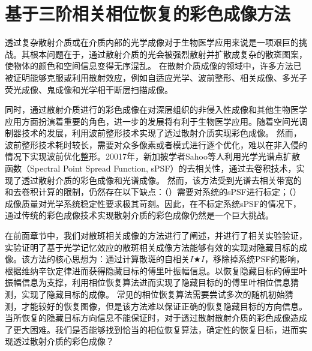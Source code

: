 
\chapter{基于三阶相关相位恢复的彩色成像方法}

透过复杂散射介质或在介质内部的光学成像对于生物医学应用来说是一项艰巨的挑战。其根本问题在于，通过散射介质的光会被强烈散射并扩散成复杂的散斑图案，使物体的颜色和空间信息变得无序混乱\cite{Freund1988,goodman_speckle_2007,bertolotti_non-invasive_2012,katz_non-invasive_2014,Yllmaz2019}。
在散射介质成像的领域中，许多方法已被证明能够克服或利用散射效应\cite{newman_imaging_2016,godara_adaptive_2010,katz_looking_2012,larson_water-soluble_2003,liu_imaging_2011,paniagua-diaz_blind_2019}，例如自适应光学\cite{godara_adaptive_2010}、波前整形\cite{katz_looking_2012}、相关成像\cite{bertolotti_non-invasive_2012,katz_non-invasive_2014}、多光子荧光成像\cite{liu_imaging_2011,larson_water-soluble_2003}、鬼成像\cite{paniagua-diaz_blind_2019}和光学相干断层扫描成像\cite{park_full-field_2014}。

同时，通过散射介质进行的彩色成像\cite{conkey_color_2012,leung_acousto-optic_2013,sahoo_single-shot_2017}在对深层组织的非侵入性成像和其他生物医学应用方面扮演着重要的角色，进一步的发展将有利于生物医学应用。随着空间光调制器技术的发展，利用波前整形技术实现了透过散射介质实现彩色成像\cite{leung_acousto-optic_2013,sahoo_single-shot_2017}。
然而，波前整形技术耗时较长，需要对众多像素或者模式进行逐个优化，难以在非入侵的情况下实现波前优化整形。20017年，新加披学者Sahoo等人\cite{sahoo_single-shot_2017}利用光学光谱点扩散函数（Spectral Point Spread Function, sPSF）\cite{Freund1988,goodman_speckle_2007}的去相关性，通过去卷积技术，实现了透过散射介质的彩色成像和光谱成像。
然而，该方法受到光谱去相关带宽的和去卷积计算的限制，仍然存在以下缺点：（）需要对系统的sPSF进行标定；（）成像质量对光学系统稳定性要求极其苛刻。因此，在不标定系统sPSF的情况下，通过传统的彩色成像技术实现散射介质的彩色成像仍然是一个巨大挑战。

在前面章节中，我们对散斑相关成像的方法进行了阐述，并进行了相关实验验证，实验证明了基于光学记忆效应的散斑相关成像方法能够有效的实现对隐藏目标的成像。该方法的核心思想为：通过计算散斑的自相关$I \bigstar I$，移除掉系统PSF的影响，根据维纳辛钦定律进而获得隐藏目标的傅里叶振幅信息。以恢复隐藏目标的傅里叶振幅信息为支撑，利用相位恢复算法进而实现了隐藏目标的的傅里叶相位信息猜测，实现了隐藏目标的成像。
常见的相位恢复算法需要尝试多次的随机初始猜测，才能较好的恢复图像，但是该方法难以保证正确的恢复隐藏目标的方向信息。当所恢复的隐藏目标方向信息不能保证时，对于透过散射散射介质的彩色成像造成了更大困难。我们是否能够找到恰当的相位恢复算法，确定性的恢复目标，进而实现透过散射介质的彩色成像？

